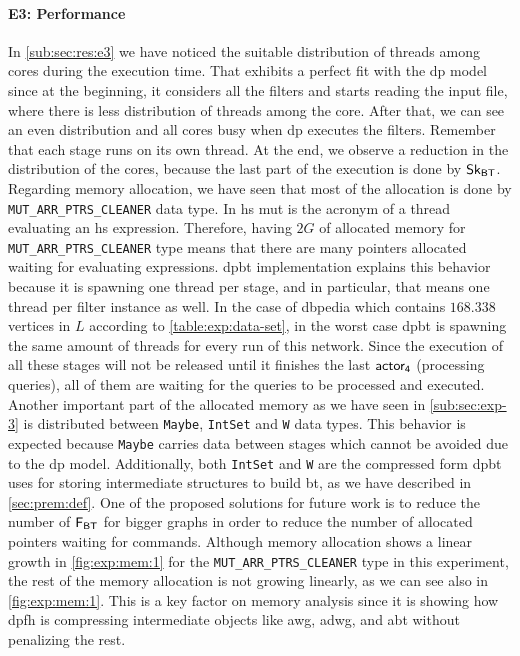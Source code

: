 \paragraph{E3: Performance} In \autoref{sub:sec:res:e3} we have noticed the suitable distribution of threads among cores during the execution time. 
That exhibits a perfect fit with the \acrshort{dp} model since at the beginning, it considers all the filters and starts reading the input file, where there is less distribution of threads among the core. 
After that, we can see an even distribution and all cores busy when \acrshort{dp} executes the filters. Remember that each stage runs on its own thread. At the end, we observe a reduction in the distribution of the cores, because  the last part of the execution is done by $\mathsf{Sk_{BT}}$.
Regarding memory allocation, we have seen that most of the allocation is done by \texttt{MUT\_ARR\_PTRS\_CLEANER} data type.
In \acrlong{hs} \acrshort{mut} is the acronym of a thread evaluating an \acrshort{hs} expression.
Therefore, having $2G$ of allocated memory for \texttt{MUT\_ARR\_PTRS\_CLEANER} type means that there are many pointers allocated waiting for evaluating expressions. \acrshort{dpbt} implementation explains this behavior because it is spawning one
thread per stage, and in particular, that means one thread per filter instance as well. In the case of \acrshort{dbpedia} which contains $168.338$ vertices in 
$L$ according to \autoref{table:exp:data-set}, in the worst case \acrshort{dpbt} is spawning the same amount of threads for every run of this network. Since the execution of all these stages will not be released until it finishes the last $\mathsf{actor_4}$ (processing queries), all of them are waiting for the queries to be processed and executed.
Another important part of the allocated memory as we have seen in \autoref{sub:sec:exp-3} is distributed between \texttt{Maybe}, \texttt{IntSet} and \texttt{W} data types. This behavior is expected because \texttt{Maybe} carries data between stages which cannot be avoided due to the \acrshort{dp} model. Additionally,  both \texttt{IntSet} and \texttt{W} are the 
compressed form \acrshort{dpbt} uses for storing intermediate structures to build \acrshort{bt}, as we have described in \autoref{sec:prem:def}.
One of the proposed solutions for future work is to reduce the number of $\mathsf{F_{BT}}$ for bigger graphs in order to reduce the number of allocated pointers waiting for commands.
Although memory allocation shows a linear growth in \autoref{fig:exp:mem:1} for the \texttt{MUT\_ARR\_PTRS\_CLEANER} type in this experiment, the rest of the memory allocation is not growing linearly, as we can see also in \autoref{fig:exp:mem:1}. This is a key factor on memory analysis since it is showing how \acrshort{dpfh} is compressing intermediate objects like \acrshort{awg}, \acrshort{adwg}, and \acrshort{abt} without penalizing the rest. 
